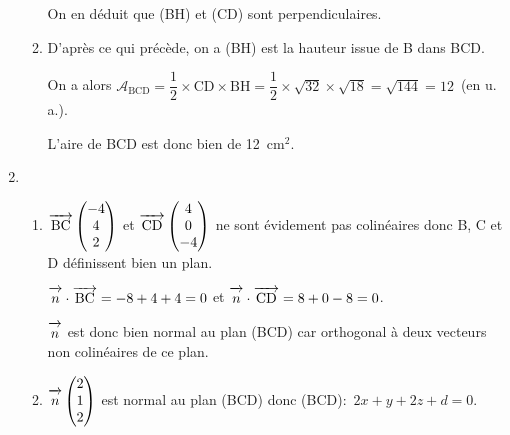 \documentclass[11pt,a4paper,answers,fancyhdr]{exam}
\newcommand{\vect}[1]{\overrightarrow{\,\mathstrut#1\,}}
\newcommand{\x}{\times}
\begin{document}
\begin{enumerate}
\begin{enumerate}
\begin{solution}
On en déduit que (BH) et (CD) sont perpendiculaires.

\end{solution}

		\item %
		
		\begin{solution}
D'après ce qui précède, on a (BH) est la hauteur issue de B dans BCD.
		
On a alors $\mathcal{A}_{\text{BCD}}=\dfrac{1}{2}\x \text{CD}\x \text{BH}=\dfrac{1}{2}\x \sqrt{32}\x \sqrt{18}=\sqrt{144}=12$~(en u. a.).
		
L'aire de BCD est donc bien de 12~cm$^2$.
		\end{solution}
		
	\end{enumerate}
\item 
	\begin{enumerate}
		\item %
		
\begin{solution}
		
$\vect{\text{BC}}\begin{pmatrix}
-4\\4\\2
\end{pmatrix}$ et $\vect{\text{CD}}\begin{pmatrix}
4\\0\\-4
\end{pmatrix}$ ne sont évidement pas colinéaires donc B, C et D définissent bien un plan.

$\vect{n}\cdot\vect{\text{BC}}=-8+4+4=0$ et $\vect{n}\cdot\vect{\text{CD}}=8+0-8=0$. 

$\vect{n}$ est donc bien normal au plan (BCD) car orthogonal à deux vecteurs non colinéaires de ce plan.
		\end{solution}
		
		\item %
		
\begin{solution}
		
$\vect{n}\begin{pmatrix}2\\1\\2\end{pmatrix}$ est normal au plan (BCD) donc (BCD):~$2x+y+2z+d=0$.
		

\end{solution}
\end{enumerate}
\end{enumerate}
\end{document}
